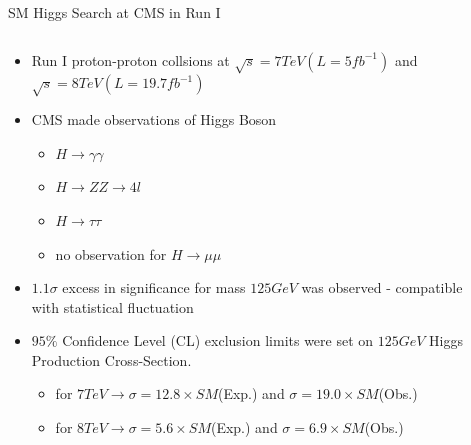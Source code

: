 \documentclass[pdf, 9pt]{beamer}
\begin{document}
  \begin{frame}{SM Higgs Search at CMS in Run I}
    \begin{columns}[T]
      \begin{column}{0.7\textwidth}
        \begin{itemize}
          \item Run I proton-proton collsions at $\sqrt{s}=7 TeV (L = 5 fb^{-1})$ and $\sqrt{s}=8 TeV (L = 19.7 fb^{-1})$
          \item CMS made observations of Higgs Boson
            \begin{itemize}
              \item $H \rightarrow \gamma\gamma$
              \item $H \rightarrow ZZ \rightarrow 4l$
              \item $H \rightarrow \tau\tau$
              \item \alert{no observation for $H \rightarrow \mu\mu$}
            \end{itemize}
          \item \alert{$1.1\sigma$ excess in significance} for mass $125GeV$ was observed - compatible with statistical fluctuation
          \item $95\%$ Confidence Level (CL) exclusion limits were set on $125GeV$ Higgs Production Cross-Section.
            \begin{itemize}
              \item for $7TeV \rightarrow \sigma = 12.8 \times SM$(Exp.) and \alert{$\sigma = 19.0 \times SM$(Obs.)}
              \item for $8TeV \rightarrow \sigma = 5.6 \times SM$(Exp.) and \alert{$\sigma = 6.9 \times SM$(Obs.)}
            \end{itemize}
        \end{itemize}
      \end{column}
      \begin{column}{0.3\textwidth}

\end{column}
\end{columns}
\end{frame}
\end{document}

